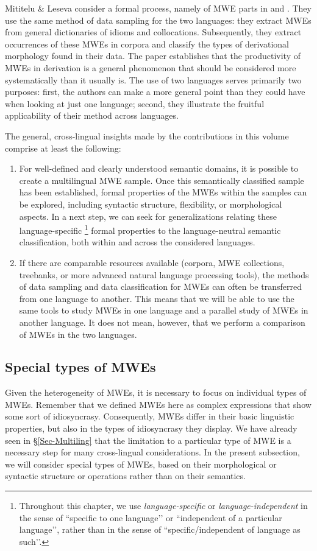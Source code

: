 \documentclass[output=paper]{langsci/langscibook}
\begin{document}
Mititelu \& Leseva consider a formal process, namely  of MWE parts in  and . They use the same method of data sampling for the two languages: they extract MWEs from general dictionaries of idioms and collocations. Subsequently, they extract occurrences of these MWEs in corpora and classify the types of derivational morphology found in their data. The paper establishes that the productivity of MWEs in derivation is a general phenomenon that should be considered more systematically than it usually is. The use of two languages serves primarily two purposes: first, the authors can make a more general point than they could have when looking at just one language; second, they illustrate the fruitful applicability of their method across languages.

The general, cross-lingual insights made by the contributions in this volume comprise at least the following: 
\begin{enumerate}
\item For well-defined and clearly understood semantic domains, it is possible to create a multilingual MWE sample. Once this semantically classified sample has been established, formal properties of the MWEs within the samples can be explored, including syntactic structure, flexibility, or morphological aspects. In a next step, we can seek for generalizations relating these language-specific%
\footnote{Throughout this chapter, we use \emph{language-specific} or \emph{language-independent} in the sense of ``specific to one language’' or ``independent of a particular language'’, rather than in the sense of ``specific/independent of language as such’'.} 
formal properties to the language-neutral semantic classification, both within and across the considered languages.
\item If there are comparable resources available (corpora, MWE collections, treebanks, or more advanced natural language processing tools), the methods of data sampling and data classification for MWEs can often be transferred from one language to another. This means that we will be able to use the same tools to study MWEs in one language and a parallel study of MWEs in another language. It does not mean, however, that we perform a comparison of MWEs in the two languages. \\
\end{enumerate}

\subsection{Special types of MWEs}\label{Sec-SpecialType} 
Given the heterogeneity of MWEs, it is necessary to focus on individual types of MWEs. Remember that we defined MWEs here as complex expressions that show some sort of idiosyncrasy. Consequently, MWEs differ in their basic linguistic properties, but also in the types of idiosyncrasy they display. We have already seen in §\ref{Sec-Multiling} that the limitation to a particular type of MWE is a necessary step for many cross-lingual considerations. In the present subsection, we will consider special types of MWEs, based on their morphological or syntactic structure or operations rather than on their semantics.
\end{document}
